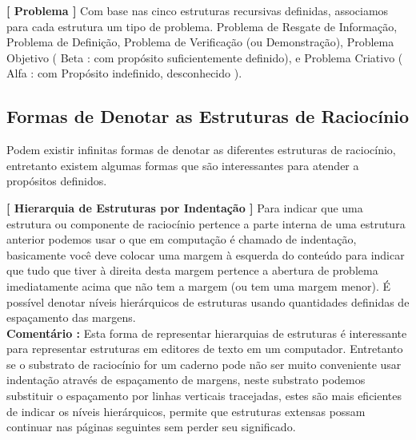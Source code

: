 \documentclass[10pt,a4paper]{report}
\begin{document}
\textbf{[ Problema ]} Com base nas cinco estruturas recursivas definidas, associamos para cada estrutura um tipo de problema. Problema de Resgate de Informação, Problema de Definição, Problema de Verificação (ou Demonstração), Problema Objetivo ( Beta : com propósito suficientemente definido), e Problema Criativo ( Alfa : com Propósito indefinido, desconhecido ).


\subsection{Formas de Denotar as Estruturas de Raciocínio}

\hspace{\baselineskip}

Podem existir infinitas formas de denotar as diferentes estruturas de raciocínio, entretanto existem algumas formas que são interessantes para atender a propósitos definidos.

\hspace{\baselineskip}

\textbf{[ Hierarquia de Estruturas por Indentação ]} Para indicar que uma estrutura ou componente de raciocínio pertence a parte interna de uma estrutura anterior podemos usar o que em computação é chamado de indentação, basicamente você deve colocar uma margem à esquerda do conteúdo para indicar que tudo que tiver à direita desta margem pertence a abertura de problema imediatamente acima que não tem a margem (ou tem uma margem menor). É possível denotar níveis hierárquicos de estruturas usando quantidades definidas de espaçamento das margens.\\

\textbf{Comentário :} Esta forma de representar hierarquias de estruturas é interessante para representar estruturas em editores de texto em um computador. Entretanto se o substrato de raciocínio for um caderno pode não ser muito conveniente usar indentação através de espaçamento de margens, neste substrato podemos substituir o espaçamento por linhas verticais tracejadas, estes são mais eficientes de indicar os níveis hierárquicos, permite que estruturas extensas possam continuar nas páginas seguintes sem perder seu significado.
\end{document}
